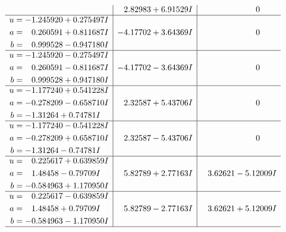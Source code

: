 \documentclass[1p]{elsarticle_modified}
\theoremstyle{definition}
\begin{document}
$$\begin{array}{c|c|c}
 & \phantom{-}2.82983 + 6.91529 I & \phantom{-0.000000 } 0 \\ \hline\begin{aligned}
u &= -1.245920 + 0.275497 I \\
a &= \phantom{-}0.260591 + 0.811687 I \\
b &= \phantom{-}0.999528 - 0.947180 I\end{aligned}
 & -4.17702 + 3.64369 I & \phantom{-0.000000 } 0 \\ \hline\begin{aligned}
u &= -1.245920 - 0.275497 I \\
a &= \phantom{-}0.260591 - 0.811687 I \\
b &= \phantom{-}0.999528 + 0.947180 I\end{aligned}
 & -4.17702 - 3.64369 I & \phantom{-0.000000 } 0 \\ \hline\begin{aligned}
u &= -1.177240 + 0.541228 I \\
a &= -0.278209 - 0.658710 I \\
b &= -1.31264 + 0.74781 I\end{aligned}
 & \phantom{-}2.32587 + 5.43706 I & \phantom{-0.000000 } 0 \\ \hline\begin{aligned}
u &= -1.177240 - 0.541228 I \\
a &= -0.278209 + 0.658710 I \\
b &= -1.31264 - 0.74781 I\end{aligned}
 & \phantom{-}2.32587 - 5.43706 I & \phantom{-0.000000 } 0 \\ \hline\begin{aligned}
u &= \phantom{-}0.225617 + 0.639859 I \\
a &= \phantom{-}1.48458 - 0.79709 I \\
b &= -0.584963 + 1.170950 I\end{aligned}
 & \phantom{-}5.82789 + 2.77163 I & \phantom{-}3.62621 - 5.12009 I \\ \hline\begin{aligned}
u &= \phantom{-}0.225617 - 0.639859 I \\
a &= \phantom{-}1.48458 + 0.79709 I \\
b &= -0.584963 - 1.170950 I\end{aligned}
 & \phantom{-}5.82789 - 2.77163 I & \phantom{-}3.62621 + 5.12009 I\\
 \hline 
 \end{array}$$\newpage$$\begin{array}{c|c|c}  

\end{array}$$
\end{document}
